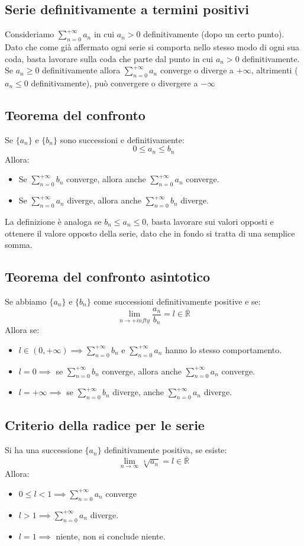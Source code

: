 \documentclass[12pt,a4paper]{article}
\begin{document}
\subsection{Serie definitivamente a termini positivi}
Consideriamo $\sum_{n=0}^{+\infty} a_n$ in cui $a_n > 0$ definitivamente (dopo un certo punto).\\
Dato che come già affermato ogni serie si comporta nello stesso modo di ogni sua coda, basta lavorare sulla coda che parte dal punto in cui $a_n > 0$ definitivamente.\\
Se $a_n \geq 0$ definitivamente allora $\sum_{n=0}^{+\infty} a_n$ converge o diverge a $+\infty$, altrimenti ($a_n \leq 0$ definitivamente), può convergere o divergere a $-\infty$
\subsection{Teorema del confronto}
Se $\{a_n\}$ e $\{b_n\}$ sono successioni e definitivamente:
\[
0 \leq a_n \leq b_n
\]
Allora:
\begin{itemize}
  \item Se $\sum_{n=0}^{+\infty} b_n$ converge, allora anche $\sum_{n=0}^{+\infty} a_n$ converge.
  \item Se $\sum_{n=0}^{+\infty} a_n$ diverge, allora anche $\sum_{n=0}^{+\infty} b_n$ diverge.
\end{itemize}
La definizione è analoga se $b_n \leq a_n \leq 0$, basta lavorare sui valori opposti e ottenere il valore opposto della serie, dato che in fondo si tratta di una semplice somma.
\subsection{Teorema del confronto asintotico}
Se abbiamo $\{a_n\}$ e $\{b_n\}$ come successioni definitivamente positive e se:\
\[
\lim_{n \to + infty} \frac{a_n}{b_n} = l \in \overline{\mathbb{R}}  
\]
Allora se:
\begin{itemize}
  \item $l \in (0,+\infty) \implies \sum_{n=0}^{+\infty} b_n$ e $\sum_{n=0}^{+\infty} a_n$ hanno lo stesso comportamento.
  \item $l = 0 \implies $ se $\sum_{n=0}^{+\infty} b_n$ converge, allora anche $\sum_{n=0}^{+\infty} a_n$ converge.
  \item $l = +\infty \implies$ se $\sum_{n=0}^{+\infty} b_n$ diverge, anche $\sum_{n=0}^{+\infty} a_n$ diverge.
\end{itemize}
\subsection{Criterio della radice per le serie}
Si ha una successione $\{a_n\}$ definitivamente positiva, se esiste:
\[
\lim_{n \to \infty} \sqrt[4]{a_n} = l \in \overline{\mathbb{R}}
\]
Allora:
\begin{itemize}
  \item $0 \leq l < 1 \implies \sum_{n=0}^{+\infty} a_n$ converge
  \item $l > 1 \implies \sum_{n=0}^{+\infty} a_n$ diverge. 
  \item $l = 1 \implies$ niente, non si conclude niente.
\end{itemize}
\end{document}
